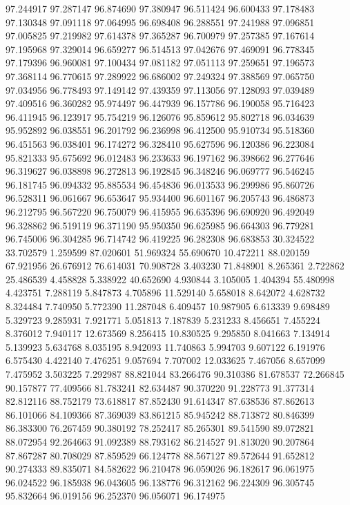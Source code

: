 97.244917
97.287147
96.874690
97.380947
96.511424
96.600433
97.178483
97.130348
97.091118
97.064995
96.698408
96.288551
97.241988
97.096851
97.005825
97.219982
97.614378
97.365287
96.700979
97.257385
97.167614
97.195968
97.329014
96.659277
96.514513
97.042676
97.469091
96.778345
97.179396
96.960081
97.100434
97.081182
97.051113
97.259651
97.196573
97.368114
96.770615
97.289922
96.686002
97.249324
97.388569
97.065750
97.034956
96.778493
97.149142
97.439359
97.113056
97.128093
97.039489
97.409516
96.360282
95.974497
96.447939
96.157786
96.190058
95.716423
96.411945
96.123917
95.754219
96.126076
95.859612
95.802718
96.034639
95.952892
96.038551
96.201792
96.236998
96.412500
95.910734
95.518360
96.451563
96.038401
96.174272
96.328410
95.627596
96.120386
96.223084
95.821333
95.675692
96.012483
96.233633
96.197162
96.398662
96.277646
96.319627
96.038898
96.272813
96.192845
96.348246
96.069777
96.546245
96.181745
96.094332
95.885534
96.454836
96.013533
96.299986
95.860726
96.528311
96.061667
96.653647
95.934400
96.601167
96.205743
96.486873
96.212795
96.567220
96.750079
96.415955
96.635396
96.690920
96.492049
96.328862
96.519119
96.371190
95.950350
96.625985
96.664303
96.779281
96.745006
96.304285
96.714742
96.419225
96.282308
96.683853
30.324522
33.702579
1.259599
87.020601
51.969324
55.690670
10.472211
88.020159
67.921956
26.676912
76.614031
70.908728
3.403230
71.848901
8.265361
2.722862
25.486539
4.458828
5.338922
40.652690
4.930844
3.105005
1.404394
55.480998
4.423751
7.288119
5.847873
4.705896
11.529140
5.658018
8.642072
4.628732
8.324484
7.740950
5.772390
11.287048
6.409457
10.987905
6.613339
9.698489
5.329723
9.285931
7.921771
5.051813
7.187839
5.231233
8.456651
7.455224
8.376012
7.940117
12.673569
8.256415
10.830525
9.295850
8.041663
7.134914
5.139923
5.634768
8.035195
8.942093
11.740863
5.994703
9.607122
6.191976
6.575430
4.422140
7.476251
9.057694
7.707002
12.033625
7.467056
8.657099
7.475952
3.503225
7.292987
88.821044
83.266476
90.310386
81.678537
72.266845
90.157877
77.409566
81.783241
82.634487
90.370220
91.228773
91.377314
82.812116
88.752179
73.618817
87.852430
91.614347
87.638536
87.862613
86.101066
84.109366
87.369039
83.861215
85.945242
88.713872
80.846399
86.383300
76.267459
90.380192
78.252417
85.265301
89.541590
89.072821
88.072954
92.264663
91.092389
88.793162
86.214527
91.813020
90.207864
87.867287
80.708029
87.859529
66.124778
88.567127
89.572644
91.652812
90.274333
89.835071
84.582622
96.210478
96.059026
96.182617
96.061975
96.024522
96.185938
96.043605
96.138776
96.312162
96.224309
96.305745
95.832664
96.019156
96.252370
96.056071
96.174975
